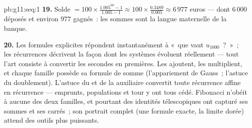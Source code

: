 \begin{solution}{pb:g11:seq:1}
\textbf{19.} Solde $= 100 \times \frac{1.005^{60} - 1}
{1.005 - 1} \approx 100 \times \frac{0.3489}{0.005} \approx
6\,977$ euros --- dont $6\,000$ déposés et environ $977$ gagnés~:
les sommes  sont la langue maternelle de la banque.

\textbf{20.} Les formules explicites répondent instantanément à
«~que vaut $u_{1000}$~?~»~; les récurrences décrivent la façon dont
les systèmes évoluent réellement --- tout l'art consiste à convertir
les secondes en premières. Les  ajoutent, les
 multiplient, et chaque famille possède sa formule de
somme (l'appariement de Gauss~; l'astuce du doublement). L'astuce du
 et de la  auxiliaire convertit toute récurrence
affine en récurrence  --- emprunts, populations et tour y
ont tous cédé. Fibonacci n'obéit à aucune des deux familles, et
pourtant des identités télescopiques ont capturé ses sommes et ses
carrés~; son portrait complet (une formule exacte, la limite dorée)
attend des outils plus puissants.
\end{solution}
